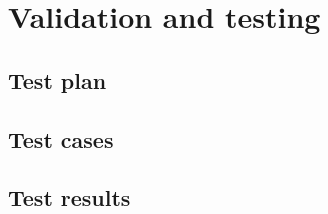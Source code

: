 \chapter{Validation and testing}
\label{ch:validation}


\section{Test plan}

\section{Test cases}

\section{Test results}
